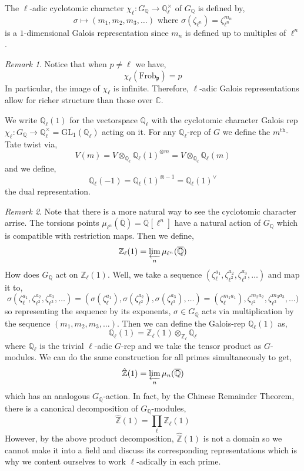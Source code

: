 \documentclass[12pt]{article}
\newcommand{\Z}{\mathbb{Z}}
\newcommand{\C}{\mathbb{C}}
\newcommand{\Q}{\mathbb{Q}}
\newcommand{\GL}[2]{\mathrm{GL}_{#1}(#2)}
\newcommand{\Frob}[0]{\mathrm{Frob}}
\newcommand{\Frobp}{\Frob_{\mathfrak{p}}}
\theoremstyle{remark}
\newtheorem*{remark}{Remark}
\theoremstyle{definition}
\newenvironment{definition}[1][Definition:]{\begin{trivlist}
\item[\hskip \labelsep {\bfseries #1}]}{\end{trivlist}}
\begin{document}
\begin{definition}
The $\ell$-adic cyclotomic character $\chi_{\ell} : G_\Q \to \Q_{\ell}^\times$ of $G_\Q$ is defined by, 
\[ \sigma \mapsto (m_1, m_2, m_3, \dots ) \text{ where } \sigma(\zeta_{\ell^n}) = \zeta_{\ell^n}^{m_n} \]
is a $1$-dimensional Galois representation since $m_n$ is defined up to multiples of $\ell^n$.
\end{definition}

\begin{remark}
Notice that when $p \neq \ell$ we have,
\[\chi_{\ell}(\Frobp) = p\]
In particular, the image of $\chi_{\ell}$ is infinite. Therefore, $\ell$-adic Galois representations allow for richer structure than those over $\C$. 
\end{remark}

\begin{definition}
We write $\Q_\ell(1)$ for the vectorspace $\Q_\ell$ with the cyclotomic character Galois rep $\chi_\ell : G_\Q \to \Q_\ell^\times = \GL{1}{\Q_\ell}$ acting on it. For any $\Q_\ell$-rep of $G$ we define the $m^{\text{th}}$-Tate twist via,
\[ V(m) = V \otimes_{\Q_\ell} \Q_\ell(1)^{\otimes m} = V \otimes_{\Q_\ell} \Q_\ell(m) \]
and we define,
\[ \Q_\ell(-1) = \Q_\ell(1)^{\otimes -1} = \Q_{\ell}(1)^\vee \]
the dual representation.
\end{definition}

\begin{remark}
Note that there is a more natural way to see the cyclotomic character arrise. The torsions points $\mu_{\ell^n}(\overline{\Q}) = \overline{\Q}[\ell^n]$ have a natural action of $G_{\Q}$ which is compatible with restriction maps. Then we define,
\[ \Z_\ell(1) = \varprojlim_{n} \mu_{\ell^n}(\overline{\Q}) \]
How does $G_\Q$ act on $\Z_\ell(1)$. Well, we take a sequence $(\zeta_\ell^{a_1}, \zeta_{\ell^2}^{a_2}, \zeta_{\ell^3}^{a_3}, \dots )$ and map it to,
\[ \sigma(\zeta_\ell^{a_1}, \zeta_{\ell^2}^{a_2}, \zeta_{\ell^3}^{a_3}, \dots ) = (\sigma(\zeta_\ell^{a_1}), \sigma(\zeta_{\ell^2}^{a_2}), \sigma(\zeta_{\ell^3}^{a_3}), \dots ) = (\zeta_\ell^{m_1 a_1}), \zeta_{\ell^2}^{m_2 a_2}, \zeta_{\ell^3}^{m_3 a_3},  \dots ) \]
so representing the sequence by its exponents, $\sigma \in G_\Q$ acts via multiplication by the sequence $(m_1, m_2, m_3, \dots)$. Then we can define the Galois-rep $\Q_\ell(1)$ as,
\[ \Q_\ell(1) = \Z_\ell(1) \otimes_{\Z_\ell} \Q_\ell \]
where $\Q_\ell$ is the trivial $\ell$-adic $G$-rep and we take the tensor product as $G$-modules. We can do the same construction for all primes simultaneously to get,
\[ \hat{\Z}(1) = \varprojlim_n \mu_n(\overline{\Q}) \]
which has an analogous $G_\Q$-action. In fact, by the Chinese Remainder Theorem, there is a canonical decomposition of $G_\Q$-modules,
\[ \hat{\Z}(1) = \prod_{\ell} \Z_\ell(1) \]
However, by the above product decomposition, $\hat{\Z}(1)$ is not a domain so we cannot make it into a field and discuss its corresponding representations which is why we content ourselves to work $\ell$-adically in each prime.
\end{remark}
\end{document}
